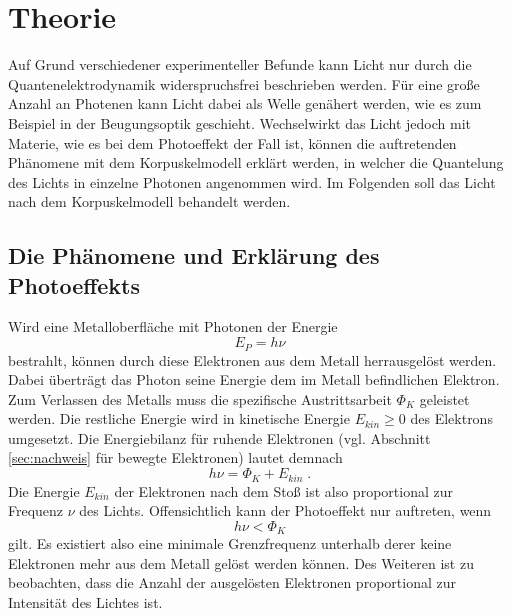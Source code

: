 \section{Theorie}
\label{sec:Theorie}
Auf Grund verschiedener experimenteller Befunde kann Licht nur durch die Quantenelektrodynamik widerspruchsfrei beschrieben werden.
Für eine große Anzahl an Photenen kann Licht dabei als Welle genähert werden, wie es zum Beispiel in der Beugungsoptik geschieht.
Wechselwirkt das Licht jedoch mit Materie, wie es bei dem Photoeffekt der Fall ist, können die auftretenden Phänomene mit dem
Korpuskelmodell erklärt werden, in welcher die Quantelung des Lichts in einzelne Photonen angenommen wird. Im Folgenden soll
das Licht nach dem Korpuskelmodell behandelt werden.

\subsection{Die Phänomene und Erklärung des Photoeffekts}
\label{sec:phänomene}
Wird eine Metalloberfläche mit Photonen der Energie
\begin{equation}
    E_{P}=h\nu
    \label{eqn:photon}
\end{equation}
bestrahlt, können durch diese Elektronen aus dem Metall herrausgelöst werden. Dabei überträgt das Photon seine Energie dem im Metall
befindlichen Elektron. Zum Verlassen des Metalls muss die spezifische
Austrittsarbeit $\Phi_K$ geleistet werden. Die restliche Energie wird in kinetische Energie $E_{kin}\geq 0$ des Elektrons umgesetzt. Die
Energiebilanz für ruhende Elektronen (vgl. Abschnitt \ref{sec:nachweis} für bewegte Elektronen) lautet demnach
\begin{equation}
    h\nu=\Phi_K+E_{kin}\;.
    \label{eqn:bilanz}
\end{equation}
Die Energie $E_{kin}$ der Elektronen nach dem Stoß ist also proportional zur Frequenz $\nu$ des Lichts.
Offensichtlich kann der Photoeffekt nur auftreten, wenn
\begin{equation*}
    h\nu<\Phi_K
\end{equation*}
gilt. Es existiert also eine minimale Grenzfrequenz unterhalb derer keine Elektronen mehr aus dem Metall gelöst werden können.
Des Weiteren ist zu beobachten, dass die Anzahl der ausgelösten Elektronen proportional zur Intensität des Lichtes ist.

